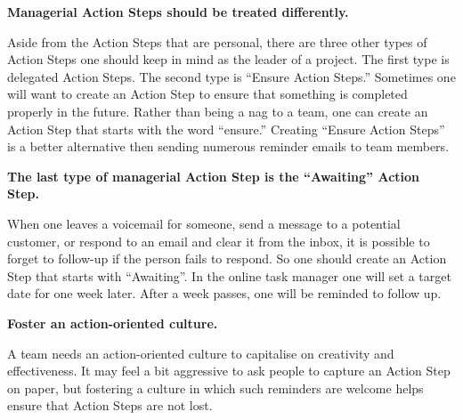 \textbf{Managerial Action Steps should be treated differently.}

Aside from the Action Steps that are personal, there are three other types of Action Steps one should keep in mind as the leader of a project. The first type is delegated Action Steps. The second type is ``Ensure Action Steps.'' Sometimes one will want to create an Action Step to ensure that something is completed properly in the future. Rather than being a nag to a  team, one can create an Action Step that starts with the word ``ensure.'' Creating ``Ensure Action Steps'' is a better alternative then sending numerous reminder emails to team members.

\textbf{The last type of managerial Action Step is the ``Awaiting'' Action Step.}

When one leaves a voicemail for someone, send a message to a potential customer, or respond to an email and clear it from the inbox, it is possible to forget to follow-up if the person fails to respond. So one should create an Action Step that starts with ``Awaiting''. In the online task manager one will set a target date for one week later. After a week passes, one will be reminded to follow up.

\textbf{Foster an action-oriented culture.}

A team needs an action-oriented culture to capitalise on creativity and effectiveness. It may feel a bit aggressive to ask people to capture an Action Step on paper, but fostering a culture in which such reminders are welcome helps ensure that Action Steps are not lost.


